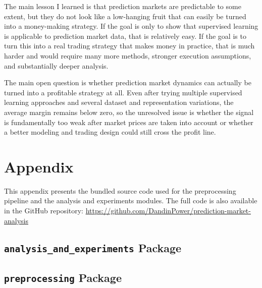 \documentclass[11pt]{article}
\begin{document}
The main lesson I learned is that prediction markets are predictable to some extent, but they do not look like a low-hanging fruit that can easily be turned into a money-making strategy. If the goal is only to show that supervised learning is applicable to prediction market data, that is relatively easy. If the goal is to turn this into a real trading strategy that makes money in practice, that is much harder and would require many more methods, stronger execution assumptions, and substantially deeper analysis.

The main open question is whether prediction market dynamics can actually be turned into a profitable strategy at all. Even after trying multiple supervised learning approaches and several dataset and representation variations, the average margin remains below zero, so the unresolved issue is whether the signal is fundamentally too weak after market prices are taken into account or whether a better modeling and trading design could still cross the profit line.




\clearpage
\appendix
\section{Appendix}

This appendix presents the bundled source code used for the preprocessing pipeline and the analysis and experiments modules. The full code is also available in the GitHub repository: \url{https://github.com/DandinPower/prediction-market-analysis}

\subsection{\texttt{analysis\_and\_experiments} Package}


\subsection{\texttt{preprocessing} Package}

\end{document}
